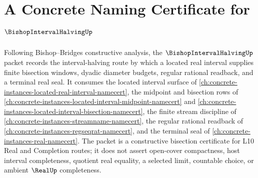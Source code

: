 \chapter{A Concrete Naming Certificate for $\BishopIntervalHalvingUp$}
\label{ch:concrete-instances-bishop-interval-halving-namecert}

Following Bishop--Bridges constructive analysis, the $\BishopIntervalHalvingUp$ packet records the interval-halving route by which a located real interval supplies finite bisection windows, dyadic diameter budgets, regular rational readback, and a terminal real seal. It consumes the located interval surface of \autoref{ch:concrete-instances-located-real-interval-namecert}, the midpoint and bisection rows of \autoref{ch:concrete-instances-located-interval-midpoint-namecert} and \autoref{ch:concrete-instances-located-interval-bisection-namecert}, the finite stream discipline of \autoref{ch:concrete-instances-streamname-namecert}, the regular rational readback of \autoref{ch:concrete-instances-regseqrat-namecert}, and the terminal seal of \autoref{ch:concrete-instances-real-namecert}. The packet is a constructive bisection certificate for L10 Real and Completion routes; it does not assert open-cover compactness, host interval completeness, quotient real equality, a selected limit, countable choice, or ambient $\RealUp$ completeness.

